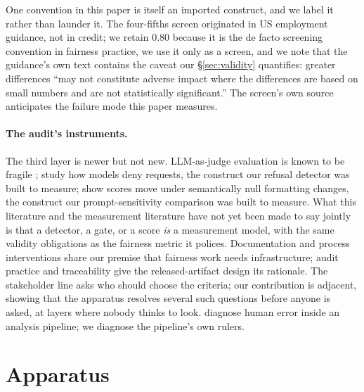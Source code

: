 \documentclass[sigconf,nonacm]{acmart}
\begin{document}
One convention in this paper is itself an imported construct, and we label it
rather than launder it. The four-fifths screen originated in US employment
guidance, not in credit; we retain $0.80$ because it is the de facto screening
convention in fairness practice, we use it only as a screen, and we note that
the guidance's own text contains the caveat our \S\ref{sec:validity}
quantifies: greater differences ``may not constitute adverse impact where the
differences are based on small numbers and are not statistically
significant.'' The screen's own source anticipates the failure mode this
paper measures.

\paragraph{The audit's instruments.} The third layer is newer but not new.
LLM-as-judge evaluation is known to be fragile \citep{zheng2023};
\citet{wester2024} study how models deny requests, the construct our
refusal detector was built to measure; \citet{sclar2024} show scores move
under semantically null formatting changes, the construct our
prompt-sensitivity comparison was built to measure. What this literature and
the measurement literature have not yet been made to say jointly is that a
detector, a gate, or a score \emph{is} a measurement model, with the same
validity obligations as the fairness metric it polices. Documentation and
process interventions \citep{mitchell2019,gebru2021,madaio2020} share our
premise that fairness work needs infrastructure; audit practice
\citep{metaxa2021,raji2019,raji2020} and traceability \citep{kroll2021} give
the released-artifact design its rationale. The stakeholder line
\citep{luo2025,luo2026,luo2026b,deshpande2022,stumpf2024,kim2025} asks who
should choose the criteria; our contribution is adjacent, showing that the
apparatus resolves several such questions before anyone is asked, at layers
where nobody thinks to look. \citet{zamfirescu2022} diagnose human error
inside an analysis pipeline; we diagnose the pipeline's own rulers.

\section{Apparatus}
\label{sec:apparatus}
\end{document}
